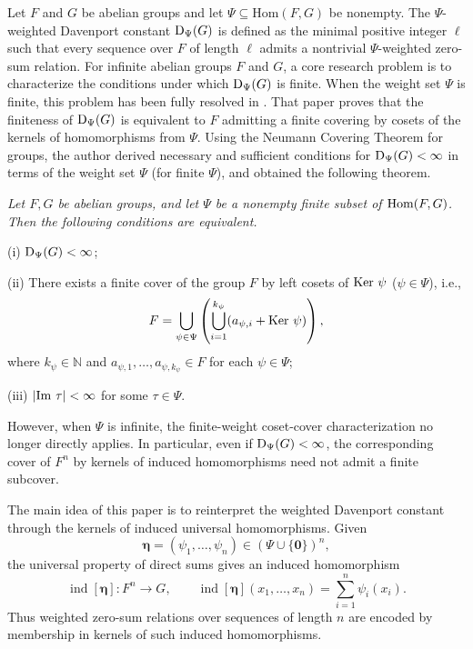 \documentclass[a4paper, 12pt]{article}
\begin{document}
Let $F$ and $G$ be abelian groups and let $\Psi \subseteq \mathrm{Hom}(F,G)$ be nonempty. The $\Psi$-weighted Davenport constant ${\rm D}_\Psi(G)$ is defined as the minimal positive integer $\ell$ such that every sequence over $F$ of length $\ell$ admits a nontrivial $\Psi$-weighted zero-sum relation.
For infinite abelian groups $F$ and $G$, a core research problem is to characterize the conditions under which ${\rm D}_\Psi(G)$ is finite. When the weight set $\Psi$ is finite, this problem has been fully resolved in \cite{WangcommInAlgebra}. That paper proves that the finiteness of ${\rm D}_\Psi(G)$ is equivalent to $F$ admitting a finite covering by cosets of the kernels of homomorphisms from $\Psi$. Using the Neumann Covering Theorem for groups, the author derived necessary and sufficient conditions for ${\rm D}_{\Psi}(G)<\infty$ in terms of the weight set $\Psi$ (for finite $\Psi$), and obtained the following theorem.



 \cite{WangcommInAlgebra} {\sl Let $F, G$ be abelian groups, and let $\Psi$ be a nonempty finite subset of  ${\rm Hom}(F, G)$. Then the following conditions are equivalent.

(i) ${\rm D}_{\Psi}(G)<\infty$;

(ii) There exists a finite cover of the group $F$ by left cosets of ${\rm Ker} \ \psi$ ($\psi\in \Psi$), i.e.,
$$F=\bigcup\limits_{\psi\in \Psi}\left(\bigcup\limits_{i=1}^{k_{\psi}}(a_{\psi, i}+ {\rm Ker}  \ \psi)\right),$$ where $k_{\psi}\in \mathbb{N}$ and $a_{\psi, 1}, \ldots, a_{\psi, k_{\psi}}\in F$ for each $\psi\in \Psi$;

(iii) $|{\rm Im} \ \tau|<\infty$ for some $\tau\in \Psi$.}

However, when \(\Psi\) is infinite, the finite-weight coset-cover
characterization no longer directly applies.  In particular, even if
\({\rm D}_{\Psi}(G)<\infty\), the corresponding cover of \(F^n\) by kernels
of induced homomorphisms need not admit a finite subcover.

The main idea of this paper is to reinterpret the weighted Davenport
constant through the kernels of induced universal homomorphisms.  Given
$$
\boldsymbol{\eta}=(\psi_1,\ldots,\psi_n)
\in(\Psi\cup\{\mathbf 0\})^n,
$$
the universal property of direct sums gives an induced homomorphism
$$
\operatorname{ind}[\boldsymbol{\eta}]:F^n\to G,
\qquad
\operatorname{ind}[\boldsymbol{\eta}](x_1,\ldots,x_n)
=
\sum_{i=1}^{n}\psi_i(x_i).
$$
Thus weighted zero-sum relations over sequences of length \(n\) are
encoded by membership in kernels of such induced homomorphisms.
\end{document}
